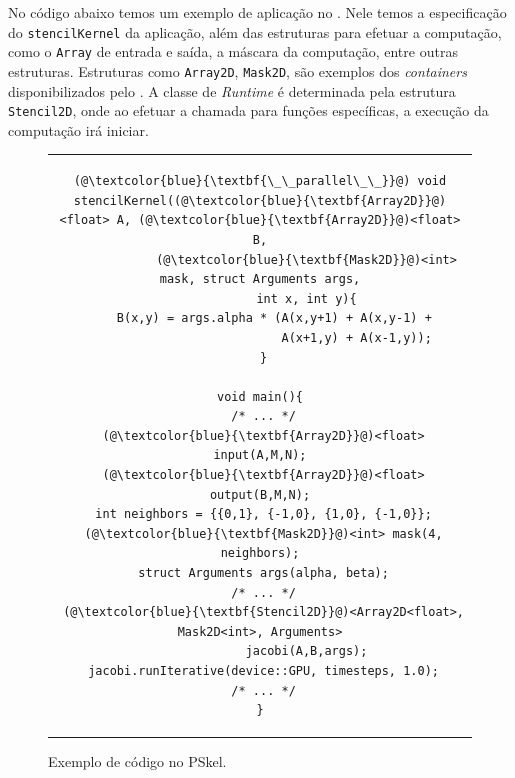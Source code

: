 No código abaixo temos um exemplo de aplicação no \fw. Nele temos a
especificação do \texttt{stencilKernel} da aplicação, além das estruturas para
efetuar a computação, como o \texttt{Array} de entrada e saída, a máscara da
computação, entre outras estruturas. Estruturas como \texttt{Array2D},
\texttt{Mask2D}, são exemplos dos \textit{containers} disponibilizados pelo \fw.
A classe de \textit{Runtime} é determinada pela estrutura \texttt{Stencil2D},
onde ao efetuar a chamada para funções específicas, a execução da computação irá
iniciar.


\renewcommand{\lstlistingname}{Código}


\begin{figure}[thp] %
\centering          %
\caption*{Exemplo de código no PSkel.}
\begin{tabular}{c}

\begin{lstlisting}[]
(@\textcolor{blue}{\textbf{\_\_parallel\_\_}}@) void
stencilKernel((@\textcolor{blue}{\textbf{Array2D}}@)<float> A, (@\textcolor{blue}{\textbf{Array2D}}@)<float> B,
             (@\textcolor{blue}{\textbf{Mask2D}}@)<int> mask, struct Arguments args,
             int x, int y){
    B(x,y) = args.alpha * (A(x,y+1) + A(x,y-1) +
                           A(x+1,y) + A(x-1,y));
 }

void main(){
 /* ... */
 (@\textcolor{blue}{\textbf{Array2D}}@)<float> input(A,M,N);
 (@\textcolor{blue}{\textbf{Array2D}}@)<float> output(B,M,N);
 int neighbors = {{0,1}, {-1,0}, {1,0}, {-1,0}};
 (@\textcolor{blue}{\textbf{Mask2D}}@)<int> mask(4, neighbors);
 struct Arguments args(alpha, beta);
 /* ... */
 (@\textcolor{blue}{\textbf{Stencil2D}}@)<Array2D<float>, Mask2D<int>, Arguments>
             jacobi(A,B,args);
 jacobi.runIterative(device::GPU, timesteps, 1.0);
 /* ... */
}
\end{lstlisting}
\end{tabular}
\end{figure}



